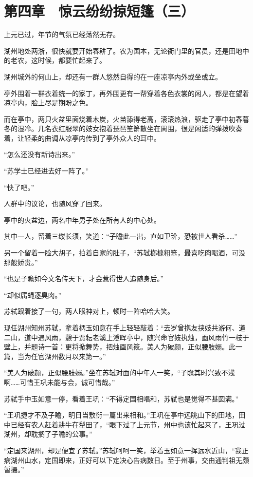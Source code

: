 \section{第四章　惊云纷纷掠短篷（三）}

上元已过，年节的气氛已经荡然无存。

湖州地处两浙，很快就要开始春耕了。农为国本，无论衙门里的官员，还是田地中的老农，这时候，都要忙起来了。

湖州城外的何山上，却还有一群人悠然自得的在一座凉亭内外或坐或立。

亭外围着一群衣着统一的家丁，再外围更有一帮穿着各色衣裳的闲人，都是在望着凉亭内，脸上尽是期盼之色。

而在亭中，两只火盆里面烧着木炭，火苗舔得老高，滚滚热浪，驱走了亭中初春暮冬的湿冷。几名衣红服翠的妓女抱着琵琶笙箫散坐在周围，很是闲适的弹拨吹奏着，让轻柔的曲调从凉亭内传到了亭外众人的耳中。

“怎么还没有新诗出来。”

“苏学士已经进去好一阵了。”

“快了吧。”

人群中的议论，也随风穿了回来。

亭中的火盆边，两名中年男子处在所有人的中心处。

其中一人，留着三缕长须，笑道：“子瞻此一出，直如卫玠，恐被世人看杀……”

另一个留着一脸大胡子，拍着自家的肚子，“苏轼榔槺粗笨，最喜吃肉喝酒，可没那般娇贵。”

“也是子瞻如今文名传天下，才会惹得世人追随身后。”

“却似腐蝇逐臭肉。”

苏轼跟着接了一句，两人眼神对上，顿时一阵哈哈大笑。

现任湖州知州苏轼，拿着柄玉如意在手上轻轻敲着：“去岁曾携友挟妓共游何、道二山，道中遇风雨，憩于贾耘老溪上澄晖亭中，随兴命官妓执烛，画风雨竹一枝于壁上，并题诗一首：更将掀舞势，把烛画风筱。美人为破颜，正似腰肢嫋。此一篇，当为任官湖州数月以来第一。”

“美人为破颜，正似腰肢嫋。”坐在苏轼对面的中年人一笑，“子瞻其时兴致不浅啊……可惜王巩未能与会，诚可惜哉。”

苏轼手中玉如意一停，看着王巩：“不得定国相唱和，苏轼也是觉得不甚圆满。”

“王巩捷才不及子瞻，明日当敷衍一篇出来相和。”王巩在亭中远眺山下的田地，田中已经有农人赶着耕牛在犁田了，“眼下过了上元节，州中也该忙起来了，王巩过湖州，却耽搁了子瞻的公事。”

“定国来湖州，却是便宜了苏轼。”苏轼呵呵一笑，举着玉如意一挥远水近山，“我正病湖州山水，定国即来，正好可以下定决心告病数日。至于州事，交由通判祖无颇暂摄。”

